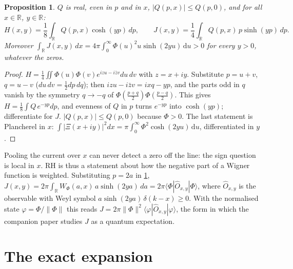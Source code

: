 \documentclass[11pt]{article}
\newtheorem{proposition}[theorem]{Proposition}
\theoremstyle{definition}\newtheorem{definition}[theorem]{Definition}
\theoremstyle{remark}\newtheorem{remark}[theorem]{Remark}
\newcommand{\R}{\mathbb R}\newcommand{\C}{\mathbb C}\newcommand{\N}{\mathbb N}
\newcommand{\dd}{\,\mathrm d}\newcommand{\e}{\mathrm e}
\begin{document}
\begin{proposition}\label{prop:HJ}
$Q$ is real, even in $p$ and in $x$, $|Q(p,x)|\le Q(p,0)$, and for all $x\in\R$, $y\in\R$:
\[
H(x,y)=\frac18\int_\R Q(p,x)\cosh(yp)\,dp,\qquad J(x,y)=\frac14\int_\R Q(p,x)\,p\sinh(yp)\,dp .
\]
Moreover $\int_\R J(x,y)\,dx=4\pi\int_0^\infty\Phi(u)^2u\sinh(2yu)\dd u>0$ for every $y>0$, whatever the zeros.
\end{proposition}
\begin{proof}
$H=\frac14\iint\Phi(u)\Phi(v)e^{izu-i\bar zv}du\,dv$ with $z=x+iy$. Substitute $p=u+v$, $q=u-v$ ($du\,dv=\frac12dp\,dq$); then $izu-i\bar zv=ixq-yp$, and the parts odd in $q$ vanish by the symmetry $q\to-q$ of $\Phi(\frac{p+q}2)\Phi(\frac{p-q}2)$. This gives $H=\frac18\int Q\,e^{-yp}dp$, and evenness of $Q$ in $p$ turns $e^{-yp}$ into $\cosh(yp)$; differentiate for $J$. $|Q(p,x)|\le Q(p,0)$ because $\Phi>0$. The last statement is Plancherel in $x$: $\int|\Xi(x+iy)|^2dx=\pi\int_0^\infty\Phi^2\cosh(2yu)\dd u$, differentiated in $y$.
\end{proof}
Pooling the current over $x$ can never detect a zero off the line: the sign question is local in $x$. RH is thus a statement about how the negative part of a Wigner function is weighted. Substituting $p=2a$ in \cref{prop:HJ}, $J(x,y)=2\pi\int_\R W_\Phi(a,x)\,a\sinh(2ya)\,da=2\pi\langle\Phi|\hat O_{x,y}|\Phi\rangle$, where $\hat O_{x,y}$ is the observable with Weyl symbol $a\sinh(2ya)\,\delta(k-x)\ge0$. With the normalised state $\varphi=\Phi/\|\Phi\|$ this reads $J=2\pi\|\Phi\|^2\langle\varphi|\hat O_{x,y}|\varphi\rangle$, the form in which the companion paper \cite{SQuant} studies $J$ as a quantum expectation.

\section{The exact expansion}\label{sec:expansion}
\end{document}
